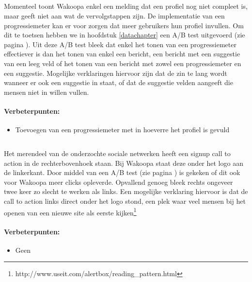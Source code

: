\documentclass[a4paper, 10pt, pdftex]{report}
\begin{document}
    \subsection{\cite{Brouns2008}}
    Momenteel toont Wakoopa enkel een melding dat een profiel nog niet compleet is, maar geeft niet aan wat de vervolgstappen zijn. De implementatie van een progressiemeter kan er voor zorgen dat meer gebruikers hun profiel invullen. Om dit te toetsen hebben we in hoofdstuk \ref{datachapter} een A/B test uitgevoerd (zie pagina \pageref{profileprogress}). Uit deze A/B test bleek dat enkel het tonen van een progressiemeter effectiever is dan het tonen van enkel een bericht, een bericht met een suggestie van een leeg veld of het tonen van een bericht met zowel een progressiemeter en een suggestie. Mogelijke verklaringen hiervoor zijn dat de zin te lang wordt wanneer er ook een suggestie in staat, of dat de suggestie velden aangeeft die mensen niet in willen vullen.

      \paragraph{\textbf{Verbeterpunten:}}
      \begin{itemize}
        \item Toevoegen van een progressiemeter met in hoeverre het profiel is gevuld
      \end{itemize}

    \subsection{\cite{Editorial2008}}
    Het merendeel van de onderzochte sociale netwerken heeft een signup call to action in de rechterbovenhoek staan. Bij Wakoopa staat deze onder het logo aan de linkerkant. Door middel van een A/B test (zie pagina \pageref{ctatest}) is gekeken of dit ook voor Wakoopa meer clicks opleverde. Opvallend genoeg bleek rechts ongeveer twee keer zo slecht te werken als links. Een mogelijke verklaring hiervoor is dat de call to action links direct onder het logo stond, een plek waar veel mensen bij het openen van een nieuwe site als eerste kijken\footnote{http://www.useit.com/alertbox/reading\_pattern.html}

      \paragraph{\textbf{Verbeterpunten:}}
      \begin{itemize}
        \item Geen
      \end{itemize}
\end{document}
